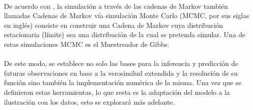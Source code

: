 \\
De acuerdo con \cite{gelman2014bayesian}, la simulaci\'on a trav\'es de las cadenas de Markov tambi\'en llamadas Cadenas de Markov v\'ia simulaci\'on Monte Carlo (MCMC, por sus siglas en ingl\'es) consiste en construir una Cadena de Markov cuya distribuci\'on estacionaria (l\'imite) sea una distribuci\'on de la cual se pretenda simular. Una de estas simulaciones MCMC es el Muestreador de Gibbs.\\
\\
De este modo, se establece no solo las bases para la inferencia y predicci\'on de futuras observaciones en base a la verosimilud extendida y la resoluci\'on de su funci\'on sino tambi\'en la implementaci\'on num\'erica de la misma. Una vez que se definieron estas herramientas, lo que resta es la adaptaci\'on del modelo a la ilustraci\'on con los datos, esto se explorar\'a m\'as adelante.  

